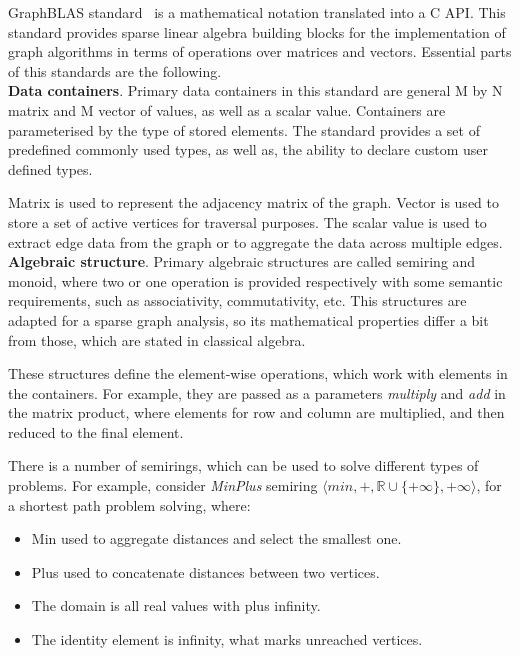 GraphBLAS standard~\cite{paper:graphblas_foundations} is a mathematical notation translated into a C API. This standard provides sparse linear algebra building blocks for the implementation of graph algorithms in terms of operations over matrices and vectors. Essential parts of this standards are the following.\\

\textbf{Data containers}. Primary data containers in this standard are general M by N matrix and M vector of values, as well as a scalar value. Containers are parameterised by the type of stored elements. The standard provides a set of predefined commonly used types, as well as, the ability to declare custom user defined types. 

Matrix is used to represent the adjacency matrix of the graph. Vector is used to store a set of active vertices for traversal purposes. The scalar value is used to extract edge data from the graph or to aggregate the data across multiple edges.\\

\textbf{Algebraic structure}. Primary algebraic structures are called semiring and monoid, where two or one operation is provided respectively with some semantic requirements, such as associativity, commutativity, etc. This structures are adapted for a sparse graph analysis, so its mathematical properties differ a bit from those, which are stated in classical algebra.

These structures define the element-wise operations, which work with elements in the containers. For example, they are passed as a parameters \textit{multiply} and \textit{add} in the matrix product, where elements for row and column are multiplied, and then reduced to the final element.

There is a number of semirings, which can be used to solve different types of problems. For example, consider \textit{MinPlus} semiring $\langle min, +, \mathbb{R} \cup \{+\infty\}, +\infty \rangle$, for a shortest path problem solving, where:

\begin{itemize}
    \item Min used to aggregate distances and select the smallest one.
    \item Plus used to concatenate distances between two vertices.
    \item The domain is all real values with plus infinity.
    \item The identity element is infinity, what marks unreached vertices.
\end{itemize}

